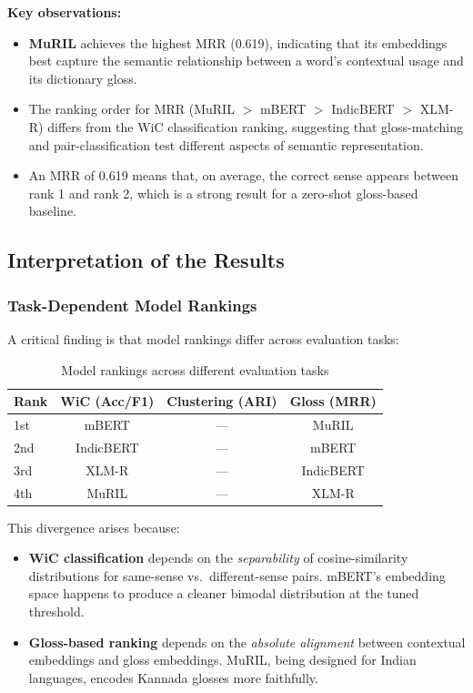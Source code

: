 \documentclass[12pt,a4paper,oneside]{article}
\begin{document}
\textbf{Key observations:}
\begin{itemize}[leftmargin=*]
  \item \textbf{MuRIL} achieves the highest MRR (0.619), indicating that its embeddings best capture the semantic relationship between a word's contextual usage and its dictionary gloss.
  \item The ranking order for MRR (MuRIL $>$ mBERT $>$ IndicBERT $>$ XLM-R) differs from the WiC classification ranking, suggesting that gloss-matching and pair-classification test different aspects of semantic representation.
  \item An MRR of 0.619 means that, on average, the correct sense appears between rank 1 and rank 2, which is a strong result for a zero-shot gloss-based baseline.
\end{itemize}

\subsection{Interpretation of the Results}

\subsubsection{Task-Dependent Model Rankings}

A critical finding is that model rankings differ across evaluation tasks:

\begin{table}[H]
\centering
\caption{Model rankings across different evaluation tasks}
\label{tab:rankings}
\begin{tabular}{l c c c}
\toprule
\textbf{Rank} & \textbf{WiC (Acc/F1)} & \textbf{Clustering (ARI)} & \textbf{Gloss (MRR)} \\
\midrule
1st & mBERT & --- & MuRIL \\
2nd & IndicBERT & --- & mBERT \\
3rd & XLM-R & --- & IndicBERT \\
4th & MuRIL & --- & XLM-R \\
\bottomrule
\end{tabular}
\end{table}

This divergence arises because:
\begin{itemize}[leftmargin=*]
  \item \textbf{WiC classification} depends on the \textit{separability} of cosine-similarity distributions for same-sense vs.\ different-sense pairs. mBERT's embedding space happens to produce a cleaner bimodal distribution at the tuned threshold.
  \item \textbf{Gloss-based ranking} depends on the \textit{absolute alignment} between contextual embeddings and gloss embeddings. MuRIL, being designed for Indian languages, encodes Kannada glosses more faithfully.
\end{itemize}
\end{document}
